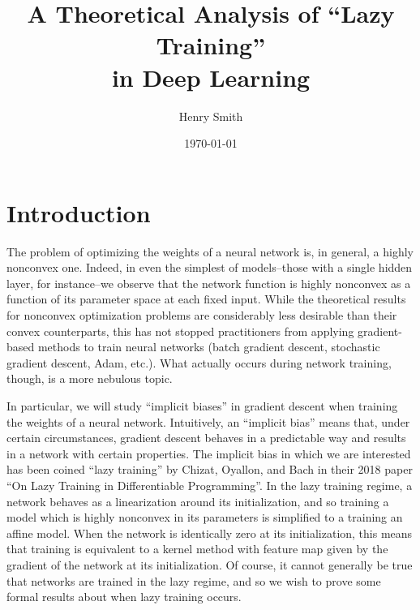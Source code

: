 \documentclass{article}
\title{\textbf{A Theoretical Analysis of \enquote{Lazy Training}\\ in Deep Learning}}
\author[]{Henry Smith}
\affil[]{\normalsize Yale University}
\date{\today}
\begin{document}
\maketitle

\begin{abstract}
    \noindent \end{abstract}

\pagebreak

\section{Introduction}\label{introduction}

The problem of optimizing the weights of a neural network is, in general, a highly nonconvex one. Indeed, in even the simplest of models--those with a single hidden layer, for instance--we observe that the network function is highly nonconvex as a function of its parameter space at each fixed input. While the theoretical results for nonconvex optimization problems are considerably less desirable than their convex counterparts, this has not stopped practitioners from applying gradient-based methods to train neural networks (batch gradient descent, stochastic gradient descent, Adam, etc.). What actually occurs during network training, though, is a more nebulous topic. 

In particular, we will study \enquote{implicit biases} in gradient descent when training the weights of a neural network. Intuitively, an \enquote{implicit bias} means that, under certain circumstances, gradient descent behaves in a predictable way and results in a network with certain properties. The implicit bias in which we are interested has been coined \enquote{lazy training} by Chizat, Oyallon, and Bach in their 2018 paper \enquote{On Lazy Training in Differentiable Programming}. In the lazy training regime, a network behaves as a linearization around its initialization, and so training a model which is highly nonconvex in its parameters is simplified to a training an affine model. When the network is identically zero at its initialization, this means that training is equivalent to a kernel method with feature map given by the gradient of the network at its initialization. Of course, it cannot generally be true that networks are trained in the lazy regime, and so we wish to prove some formal results about when lazy training occurs.
\end{document}
